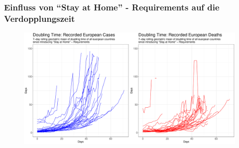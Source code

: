 \documentclass{beamer}
\begin{document}
 \begin{frame}
 	\frametitle{Einfluss von ``Stay at Home'' - Requirements auf die Verdopplungszeit}
	\begin{figure}
		\centering
		\includegraphics[width = 350pt]{plot_c6_dt.pdf}
	\end{figure}
 \end{frame}
\end{document}
